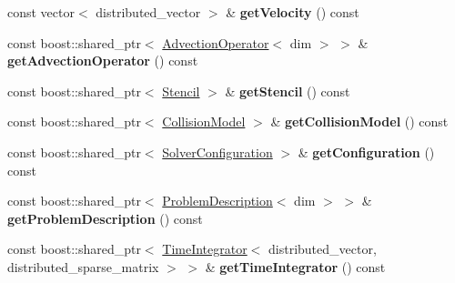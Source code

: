 \begin{DoxyCompactItemize}
\item 
\hypertarget{classnatrium_1_1CFDSolver_a0e5ec3dc278216d5827410b7db82af59}{
const vector$<$ distributed\_\-vector $>$ \& {\bfseries getVelocity} () const }
\label{classnatrium_1_1CFDSolver_a0e5ec3dc278216d5827410b7db82af59}

\item 
\hypertarget{classnatrium_1_1CFDSolver_a20e897531387c33b60a2e3c18e61c243}{
const boost::shared\_\-ptr$<$ \hyperlink{classnatrium_1_1AdvectionOperator}{AdvectionOperator}$<$ dim $>$ $>$ \& {\bfseries getAdvectionOperator} () const }
\label{classnatrium_1_1CFDSolver_a20e897531387c33b60a2e3c18e61c243}

\item 
\hypertarget{classnatrium_1_1CFDSolver_a5ef0f693bf6c7b72f17d8564b4069ce8}{
const boost::shared\_\-ptr$<$ \hyperlink{classnatrium_1_1Stencil}{Stencil} $>$ \& {\bfseries getStencil} () const }
\label{classnatrium_1_1CFDSolver_a5ef0f693bf6c7b72f17d8564b4069ce8}

\item 
\hypertarget{classnatrium_1_1CFDSolver_af573bd22cb7dff697dc5db99819f79c8}{
const boost::shared\_\-ptr$<$ \hyperlink{classnatrium_1_1CollisionModel}{CollisionModel} $>$ \& {\bfseries getCollisionModel} () const }
\label{classnatrium_1_1CFDSolver_af573bd22cb7dff697dc5db99819f79c8}

\item 
\hypertarget{classnatrium_1_1CFDSolver_a819a073ab7ac1d33a0968ca0ffc6eba4}{
const boost::shared\_\-ptr$<$ \hyperlink{classnatrium_1_1SolverConfiguration}{SolverConfiguration} $>$ \& {\bfseries getConfiguration} () const }
\label{classnatrium_1_1CFDSolver_a819a073ab7ac1d33a0968ca0ffc6eba4}

\item 
\hypertarget{classnatrium_1_1CFDSolver_ad728be4103a49d1801e3b26e0e15e944}{
const boost::shared\_\-ptr$<$ \hyperlink{classnatrium_1_1ProblemDescription}{ProblemDescription}$<$ dim $>$ $>$ \& {\bfseries getProblemDescription} () const }
\label{classnatrium_1_1CFDSolver_ad728be4103a49d1801e3b26e0e15e944}

\item 
\hypertarget{classnatrium_1_1CFDSolver_ad8db6e33d26853a6de6a0c7735ce18a5}{
const boost::shared\_\-ptr$<$ \hyperlink{classnatrium_1_1TimeIntegrator}{TimeIntegrator}$<$ distributed\_\-vector, distributed\_\-sparse\_\-matrix $>$ $>$ \& {\bfseries getTimeIntegrator} () const }
\label{classnatrium_1_1CFDSolver_ad8db6e33d26853a6de6a0c7735ce18a5}


\end{DoxyCompactItemize}
